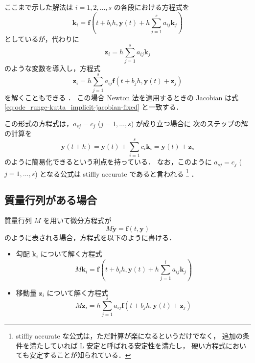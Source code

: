ここまで示した解法は $i = 1, 2, \ldots, s$ の各段における方程式を
\begin{equation}
    \bm{k}_i = \bm{f}\left(t + b_i h, \bm{y}(t) + h \sum_{j = 1}^s a_{ij} \bm{k}_j \right)
\end{equation}
としているが，代わりに
\begin{equation}
    \bm{z}_i = h \sum_{j = 1}^s a_{ij} \bm{k}_j
\end{equation}
のような変数を導入し，方程式
\begin{equation}
    \bm{z}_i = h \sum_{j = 1}^s a_{ij} \bm{f}\left(t + b_j h, \bm{y}(t) + \bm{z}_j \right)
    \label{eq:ode_runge-kutta_implicit-equation-for-differences}
\end{equation}
を解くこともできる \cite[Section IV.8.]{Hairer1991}．
この場合 Newton 法を適用するときの Jacobian は式 \eqref{eq:ode_runge-kutta_implicit-jacobian-fixed} と一致する．

この形式の方程式は，$a_{sj} = c_j$ ($j = 1, \ldots, s$) が成り立つ場合に
次のステップの解の計算を
\begin{equation}
    \bm{y}(t + h) = \bm{y}(t) + \sum_{i=1}^s c_i \bm{k}_i
    = \bm{y}(t) + \bm{z}_s
\end{equation}
のように簡易化できるという利点を持っている．
なお，このように $a_{sj} = c_j$ ($j = 1, \ldots, s$) となる公式は
stiffly accurate  であると言われる
\cite[Section IV.6.]{Hairer1991}
\footnote{stiffly accurate な公式は，ただ計算が楽になるというだけでなく，%
    追加の条件を満たしていれば L 安定と呼ばれる安定性を満たし，%
    硬い方程式においても安定することが知られている\cite[Section IV.3.]{Hairer1991}．}
．

\subsection{質量行列がある場合}

質量行列 $M$ を用いて微分方程式が
\begin{equation}
    M \dot{\bm{y}} = \bm{f}(t, \bm{y})
\end{equation}
のように表される場合，方程式を以下のように書ける．
\begin{itemize}
    \item 勾配 $\bm{k}_i$ について解く方程式
          \begin{equation}
              M \bm{k}_i = \bm{f}\left(t + b_i h, \bm{y}(t) + h \sum_{j = 1}^i a_{ij} \bm{k}_j \right)
          \end{equation}
    \item 移動量 $\bm{z}_i$ について解く方程式
          \begin{equation}
              M \bm{z}_i = h \sum_{j = 1}^s a_{ij} \bm{f}\left(t + b_j h, \bm{y}(t) + \bm{z}_j \right)
          \end{equation}
\end{itemize}

